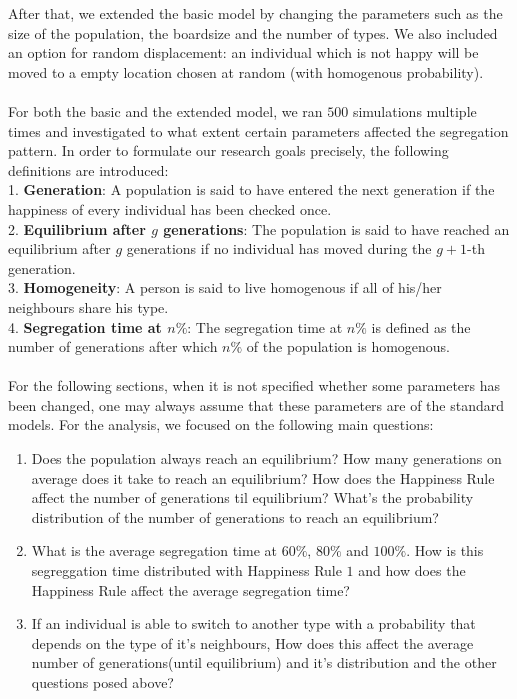 After that, we extended the basic model by changing the parameters such as the size of the population, the boardsize and the number of types. 
We also included an option for random displacement: an individual which is not happy will be moved to a empty location chosen at random (with homogenous probability).\\
\\
For both the basic and the extended model, we ran $500$ simulations multiple times and investigated to what extent certain parameters affected the segregation pattern. 
In order to formulate our research goals precisely, the following definitions are introduced:\\
1. \textbf{Generation}: 
A population is said to have entered the next generation if the happiness of every individual has been checked once. \\
2. \textbf{Equilibrium after \(g\) generations}: 
The population is said to have reached an equilibrium after \(g\) generations if no individual has moved during the \(g+1\)-th generation.\\
3. \textbf{Homogeneity}:
A person is said to live homogenous if all of his/her neighbours share his type.\\
4. \textbf{Segregation time at $n\%$}: 
The segregation time at $n\%$ is defined as the number of generations after which $n\%$ of the population is homogenous.\\
\\
For the following sections, when it is not specified whether some parameters has been changed, one may always assume that these parameters are of the standard models.
\newpage
For the analysis, we focused on the following main questions:
\begin{enumerate}
	\item 	Does the population always reach an equilibrium? 
	How many generations on average does it take to reach an equilibrium? 
	How does the Happiness Rule affect the number of generations til equilibrium? 
	What's the probability distribution of the number of generations to reach an equilibrium?

	\item What is the average segregation time at \(60\%\), \(80\%\) and \(100\%\). 
	How is this segreggation time distributed with Happiness Rule \(1\) and how does the Happiness Rule affect the average segregation time?
	
	\item If an individual is able to switch to another type with a probability that depends on the type of it's neighbours,
	How does this affect the average number of generations(until equilibrium) and it's distribution and the other questions posed above?
\end{enumerate}

